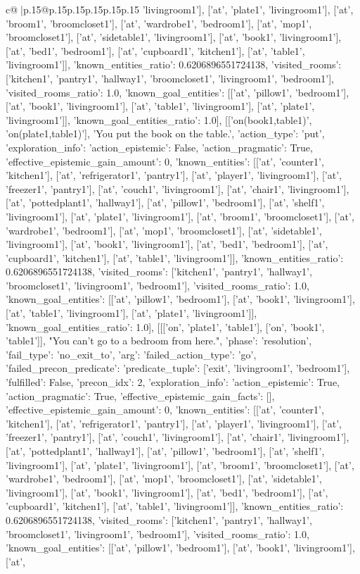 \documentclass{article}
\begin{document}
{\begin{supertabular}{c@{$\;$}|p{.15\linewidth}@{}p{.15\linewidth}p{.15\linewidth}p{.15\linewidth}p{.15\linewidth}p{.15\linewidth}}
{{{'livingroom1'], ['at', 'plate1', 'livingroom1'], ['at', 'broom1', 'broomcloset1'], ['at', 'wardrobe1', 'bedroom1'], ['at', 'mop1', 'broomcloset1'], ['at', 'sidetable1', 'livingroom1'], ['at', 'book1', 'livingroom1'], ['at', 'bed1', 'bedroom1'], ['at', 'cupboard1', 'kitchen1'], ['at', 'table1', 'livingroom1']], 'known_entities_ratio': 0.6206896551724138, 'visited_rooms': ['kitchen1', 'pantry1', 'hallway1', 'broomcloset1', 'livingroom1', 'bedroom1'], 'visited_rooms_ratio': 1.0, 'known_goal_entities': [['at', 'pillow1', 'bedroom1'], ['at', 'book1', 'livingroom1'], ['at', 'table1', 'livingroom1'], ['at', 'plate1', 'livingroom1']], 'known_goal_entities_ratio': 1.0}}], [['on(book1,table1)', 'on(plate1,table1)'], 'You put the book on the table.', {'action_type': 'put', 'exploration_info': {'action_epistemic': False, 'action_pragmatic': True, 'effective_epistemic_gain_amount': 0, 'known_entities': [['at', 'counter1', 'kitchen1'], ['at', 'refrigerator1', 'pantry1'], ['at', 'player1', 'livingroom1'], ['at', 'freezer1', 'pantry1'], ['at', 'couch1', 'livingroom1'], ['at', 'chair1', 'livingroom1'], ['at', 'pottedplant1', 'hallway1'], ['at', 'pillow1', 'bedroom1'], ['at', 'shelf1', 'livingroom1'], ['at', 'plate1', 'livingroom1'], ['at', 'broom1', 'broomcloset1'], ['at', 'wardrobe1', 'bedroom1'], ['at', 'mop1', 'broomcloset1'], ['at', 'sidetable1', 'livingroom1'], ['at', 'book1', 'livingroom1'], ['at', 'bed1', 'bedroom1'], ['at', 'cupboard1', 'kitchen1'], ['at', 'table1', 'livingroom1']], 'known_entities_ratio': 0.6206896551724138, 'visited_rooms': ['kitchen1', 'pantry1', 'hallway1', 'broomcloset1', 'livingroom1', 'bedroom1'], 'visited_rooms_ratio': 1.0, 'known_goal_entities': [['at', 'pillow1', 'bedroom1'], ['at', 'book1', 'livingroom1'], ['at', 'table1', 'livingroom1'], ['at', 'plate1', 'livingroom1']], 'known_goal_entities_ratio': 1.0}}], [[['on', 'plate1', 'table1'], ['on', 'book1', 'table1']], "You can't go to a bedroom from here.", {'phase': 'resolution', 'fail_type': 'no_exit_to', 'arg': {'failed_action_type': 'go', 'failed_precon_predicate': {'predicate_tuple': ['exit', 'livingroom1', 'bedroom1'], 'fulfilled': False, 'precon_idx': 2}}, 'exploration_info': {'action_epistemic': True, 'action_pragmatic': True, 'effective_epistemic_gain_facts': [], 'effective_epistemic_gain_amount': 0, 'known_entities': [['at', 'counter1', 'kitchen1'], ['at', 'refrigerator1', 'pantry1'], ['at', 'player1', 'livingroom1'], ['at', 'freezer1', 'pantry1'], ['at', 'couch1', 'livingroom1'], ['at', 'chair1', 'livingroom1'], ['at', 'pottedplant1', 'hallway1'], ['at', 'pillow1', 'bedroom1'], ['at', 'shelf1', 'livingroom1'], ['at', 'plate1', 'livingroom1'], ['at', 'broom1', 'broomcloset1'], ['at', 'wardrobe1', 'bedroom1'], ['at', 'mop1', 'broomcloset1'], ['at', 'sidetable1', 'livingroom1'], ['at', 'book1', 'livingroom1'], ['at', 'bed1', 'bedroom1'], ['at', 'cupboard1', 'kitchen1'], ['at', 'table1', 'livingroom1']], 'known_entities_ratio': 0.6206896551724138, 'visited_rooms': ['kitchen1', 'pantry1', 'hallway1', 'broomcloset1', 'livingroom1', 'bedroom1'], 'visited_rooms_ratio': 1.0, 'known_goal_entities': [['at', 'pillow1', 'bedroom1'], ['at', 'book1', 'livingroom1'], ['at', }}}
\end{supertabular}}
\end{document}
